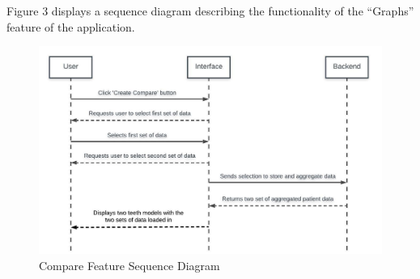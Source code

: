 \documentclass[11pt,english, titlepage]{article}
\begin{document}
  Figure 3 displays a sequence diagram describing the functionality of the ``Graphs'' feature of the application.

  \begin{figure}[H]
    \includegraphics[width=\linewidth]{comparesequence}
    \caption{Compare Feature Sequence Diagram}
    \label{fig:comparesequence}
  \end{figure}


  \pagebreak
\end{document}
